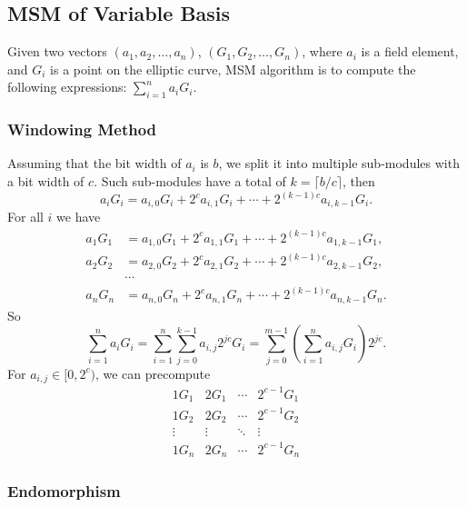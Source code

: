 \subsection{MSM of Variable Basis}

Given two vectors $(a_1,a_2,\ldots,a_n)$, $(G_1,G_2,\ldots,G_n)$, where $a_i$ is a field element, and $G_i$ is a point on the elliptic curve, MSM algorithm is to compute the following expressions: $\sum_{i=1}^n a_iG_i$.

\subsubsection{Windowing Method}

Assuming that the bit width of $a_i$ is $b$, we split it into multiple sub-modules with a bit width of $c$. Such sub-modules have a total of $k=\lceil b/c \rceil$, then
\[ a_iG_i = a_{i,0}G_i + 2^ca_{i,1}G_i + \cdots + 2^{(k-1)c}a_{i,k-1}G_i. \]
For all $i$ we have
\begin{align*}
    a_1G_1 &= a_{1,0}G_1 + 2^ca_{1,1}G_1 + \cdots + 2^{(k-1)c}a_{1,k-1}G_1, \\
    a_2G_2 &= a_{2,0}G_2 + 2^ca_{2,1}G_2 + \cdots + 2^{(k-1)c}a_{2,k-1}G_2, \\
    &\cdots \\
    a_nG_n &= a_{n,0}G_n + 2^ca_{n,1}G_n + \cdots + 2^{(k-1)c}a_{n,k-1}G_n.
\end{align*}
So
\[
    \sum_{i=1}^{n} a_iG_i =\sum_{i=1}^{n} \sum_{j=0}^{k-1} a_{i,j} 2^{jc} G_i
    =\sum_{j=0}^{m-1}\left(\sum_{i=1}^{n} a_{i,j} G_i\right) 2^{jc}.
\]
For $a_{i,j} \in [0,2^c)$, we can precompute
\[
    \begin{matrix}
        1G_1 & 2G_1 & \cdots & 2^{c-1}G_1 \\
        1G_2 & 2G_2 & \cdots & 2^{c-1}G_2 \\
        \vdots & \vdots & \ddots & \vdots \\
        1G_n & 2G_n & \cdots & 2^{c-1}G_n
    \end{matrix}
\]

\subsubsection{Endomorphism}

